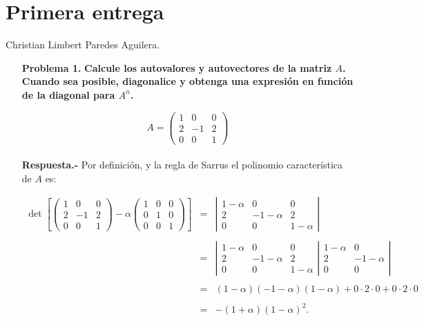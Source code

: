 \section*{\center \large Primera entrega}
\begin{center}
    Christian Limbert Paredes Aguilera.
\end{center}
\vspace*{1cm}

\begin{enumerate}

    \item[\bfseries Problema 1.] \textbf{\boldmath Calcule los autovalores y autovectores de la matriz $A$. Cuando sea posible, diagonalice y obtenga una expresión en función de la diagonal para $A^n$.}

    $$A=\left(\begin{array}{*{3}{r}}
	1 & 0 & 0 \\
	2 & -1 & 2 \\
	0 & 0 & 1 
    \end{array}\right)$$\\

    \textbf{Respuesta.-}\;  Por definición, y la regla de Sarrus el polinomio característica de $A$ es:
    
    $$ \begin{array}{rcl} 
	\det \left[
    \left(\begin{array}{*{3}{r}}
	1 & 0 & 0 \\
	2 & -1 & 2 \\
	0 & 0 & 1 
    \end{array}\right) - \alpha 
    \left(\begin{array}{*{3}{r}}
	1 & 0 & 0 \\
	0 & 1 & 0 \\
	0 & 0 & 1
\end{array}\right)\right] & = & 
    \left|\begin{array}{*{3}{c}}
	1-\alpha & 0 & 0 \\
	2 & -1-\alpha & 2 \\
	0 & 0 & 1-\alpha
	\end{array}\right| \\\\ 
	&=&  
	\left|\begin{array}{*{3}{c}}
	1-\alpha & 0 & 0 \\
	2 & -1-\alpha & 2 \\
	0 & 0 & 1-\alpha
	\end{array}\right|
	\left.\begin{array}{*{3}{c}}
	1-\alpha & 0  \\
	2 & -1-\alpha  \\
	0 & 0
	\end{array}\right|\\\\
	&=&(1-\alpha)(-1-\alpha)(1-\alpha)+0\cdot 2 \cdot 0 + 0\cdot 2 \cdot 0\\\\
	&=&-(1+\alpha)\left(1-\alpha\right)^2.
    \end{array}$$


\end{enumerate}
